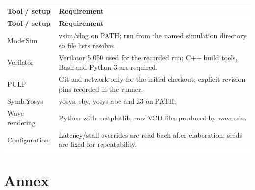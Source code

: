 \documentclass[11pt]{article}
\begin{document}
{\small
\begin{longtable}{@{}L{0.2600\dimexpr\linewidth-12pt\relax}L{0.7400\dimexpr\linewidth-12pt\relax}@{}}
\toprule
\textbf{Tool / setup} & \textbf{Requirement} \\ \midrule
\endfirsthead
\toprule
\textbf{Tool / setup} & \textbf{Requirement} \\ \midrule
\endhead
ModelSim & vsim/vlog on PATH; run from the named simulation directory so file lists resolve. \\ \addlinespace[3pt]
Verilator & Verilator 5.050 used for the recorded run; C++ build tools, Bash and Python 3 are required. \\ \addlinespace[3pt]
PULP & Git and network only for the initial checkout; explicit revision pins recorded in the runner. \\ \addlinespace[3pt]
SymbiYosys & yosys, sby, yosys-abc and z3 on PATH. \\ \addlinespace[3pt]
Wave rendering & Python with matplotlib; raw VCD files produced by waves.do. \\ \addlinespace[3pt]
Configuration & Latency/stall overrides are read back after elaboration; seeds are fixed for repeatability. \\*
\bottomrule\end{longtable}}

\clearpage
\section{Annex}
\end{document}
